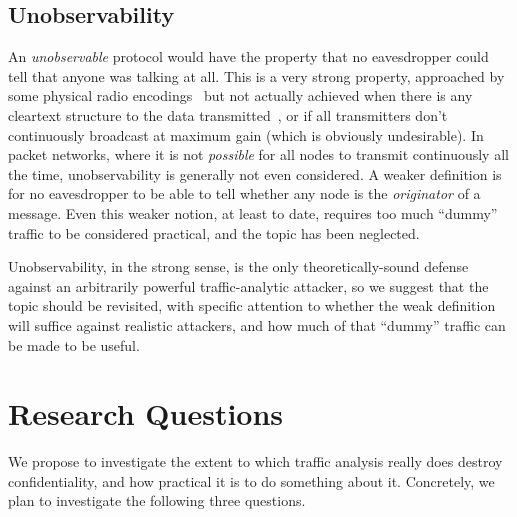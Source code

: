 \documentclass[oneside]{zarticle}
\begin{document}
\begin{multicols}{2}
\subsection{Unobservability}

An \emph{unobservable} protocol would have the property that no
eavesdropper could tell that anyone was talking at all.  This is a
very strong property, approached by some physical radio
encodings~\cite{pickholtz1982theory,yu2007dsss} but not actually
achieved when there is any cleartext structure to the data
transmitted~\cite{jia2013blind}, or if all transmitters don't
continuously broadcast at maximum gain (which is obviously
undesirable).  In packet networks, where it is not \emph{possible} for
all nodes to transmit continuously all the time, unobservability is
generally not even considered.  A weaker definition is for no
eavesdropper to be able to tell whether any node is the
\emph{originator} of a message.  Even this weaker notion, at least to
date, requires too much “dummy” traffic to be considered practical,
and the topic has been neglected.

Unobservability, in the strong sense, is the only theoretically-sound
defense against an arbitrarily powerful traffic-analytic attacker,
so we suggest that the topic should be revisited, with specific
attention to whether the weak definition will suffice against
realistic attackers, and how much of that “dummy” traffic can be made
to be useful.

\section{Research Questions}

We propose to investigate the extent to which traffic analysis really
does destroy confidentiality, and how practical it is to do something
about it.  Concretely, we plan to investigate the following three
questions.


\end{multicols}
\end{document}
